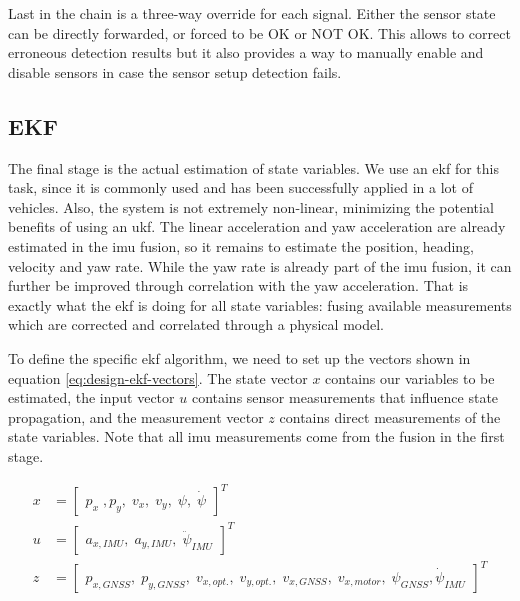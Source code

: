 Last in the chain is a three-way override for each signal. Either the sensor state can be directly forwarded, or forced to be OK or NOT OK. This allows to correct erroneous detection results but it also provides a way to manually enable and disable sensors in case the sensor setup detection fails.

\subsection{EKF}
The final stage is the actual estimation of state variables. We use an \gls{ekf} for this task, since it is commonly used and has been successfully applied in a lot of vehicles. Also, the system is not extremely non-linear, minimizing the potential benefits of using an \gls{ukf}. The linear acceleration and yaw acceleration are already estimated in the \gls{imu} fusion, so it remains to estimate the position, heading, velocity and yaw rate. While the yaw rate is already part of the \gls{imu} fusion, it can further be improved through correlation with the yaw acceleration. That is exactly what the \gls{ekf} is doing for all state variables: fusing available measurements which are corrected and correlated through a physical model.

To define the specific \gls{ekf} algorithm, we need to set up the vectors shown in equation \ref{eq:design-ekf-vectors}. The state vector $x$ contains our variables to be estimated, the input vector $u$ contains sensor measurements that influence state propagation, and the measurement vector $z$ contains direct measurements of the state variables. Note that all \gls{imu} measurements come from the fusion in the first stage.

\begin{subequations}\label{eq:design-ekf-vectors}
\begin{alignat}{2}%
x &= \begin{bmatrix}p_x\;, p_y,\; v_x,\; v_y,\; \psi,\; \dot{\psi}\end{bmatrix}^T \\%
u &= \begin{bmatrix}a_{x, \textit{IMU}},\; a_{y, \textit{IMU}},\; \ddot{\psi}_{\textit{IMU}}\end{bmatrix}^T \\%
z &= \begin{bmatrix}p_{x,\textit{GNSS}},\; p_{y,\textit{GNSS}},\; v_{x,opt.},\; v_{y,opt.},\; v_{x,\textit{GNSS}},\; v_{x,motor},\; \psi_{\textit{GNSS}}, \dot{\psi}_{\textit{IMU}}\end{bmatrix}^T
\end{alignat}
\end{subequations}


